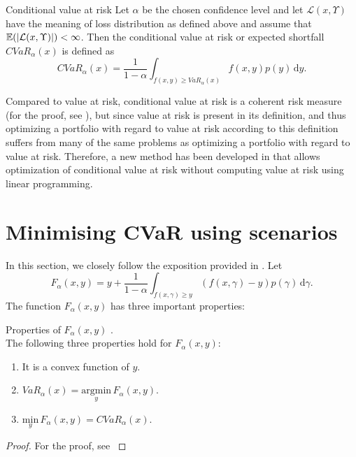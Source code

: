 \begin{defn}{Conditional value at risk \cite[p. 275]{cornuejols_tutuncu_2006}}
Let $\alpha$ be the chosen confidence level and let $\mathcal{L}(x,\Upsilon)$ have the meaning of loss distribution as defined above and assume that $\mathbb{E}(\left|{\mathcal{L}(x,\Upsilon)}\right|)<\infty$. Then the conditional value at risk or expected shortfall $CVaR_{\alpha}(x)$ is defined as
\begin{equation}
CVaR_{\alpha}(x)=\frac{1}{1-\alpha}\int_{f(x,y) \geq VaR_{\alpha}(x)} f(x,y)p(y) \, \mathrm{d} y.
\end{equation} 
\end{defn}
Compared to value at risk, conditional value at risk is a coherent risk measure (for the proof, see \cite[Example 2.26.]{mcneil2015quantitative}), but since value at risk is present in its definition, and thus optimizing a portfolio with regard to value at risk according to this definition suffers from many of the same problems as optimizing a portfolio with regard to value at risk. Therefore, a new method has been developed in \cite{Rockafellar2000OptimizationOC} that allows optimization of conditional value at risk without computing value at risk using linear programming.

\section{Minimising CVaR using scenarios}
In this section, we closely follow the exposition provided in \cite[p. 275-278]{cornuejols_tutuncu_2006}. 
Let 
\begin{equation}
\label{eq:cvar_approx}
F_{\alpha}(x,y)=y + \frac{1}{1-\alpha} \int_{f(x,\gamma) \geq y} (f(x,\gamma)-y)p(\gamma) \, \mathrm{d}\gamma.
\end{equation}
The function $F_{\alpha}(x,y)$ has three important properties:
\begin{lemma}{Properties of $F_{\alpha}(x,y)$ \cite[p. 276]{cornuejols_tutuncu_2006}.} \\
\label{lemma:properties_of_cvar_approx}
The following three properties hold for $F_{\alpha}(x,y)$:
\begin{enumerate}
	\item It is a convex function of $y$.
	\item $VaR_{\alpha}(x)=\underset{y}{\mathrm{argmin}} \, F_{\alpha}(x,y)$.
	\item $\underset{y}{\mathrm{min}} \, F_{\alpha}(x,y) = CVaR_{\alpha}(x)$.
\end{enumerate}
\end{lemma}
\begin{proof}
For the proof, see \cite[Theorems 1 and 2]{Rockafellar2000OptimizationOC}
\end{proof}
